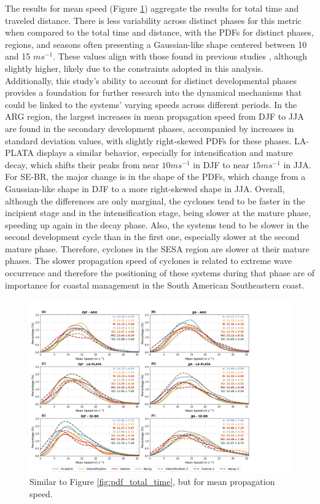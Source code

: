 The results for mean speed (Figure \ref{fig:pdf_mean_speed}) aggregate the results for total time and traveled distance. There is less variability across distinct phases for this metric when compared to the total time and distance, with the PDFs for distinct phases, regions, and seasons often presenting a Gaussian-like shape centered between 10 and 15 \(m s^{-1}\). These values align with those found in previous studies \citep{gramcianinov2019properties, gramcianinov2020analysis, hoskins2005new}, although slightly higher, likely due to the constraints adopted in this analysis. Additionally, this study's ability to account for distinct developmental phases provides a foundation for further research into the dynamical mechanisms that could be linked to the systems' varying speeds across different periods. In the ARG region, the largest increases in mean propagation speed from DJF to JJA are found in the secondary development phases, accompanied by increases in standard deviation values, with slightly right-skewed PDFs for these phases. LA-PLATA displays a similar behavior, especially for intensification and mature decay, which shifts their peaks from near \(10 m s^{-1}\) in DJF to near \(15 m s^{-1}\) in JJA. For SE-BR, the major change is in the shape of the PDFs, which change from a Gaussian-like shape in DJF to a more right-skewed shape in JJA. Overall, although the differences are only marginal, the cyclones tend to be faster in the incipient stage and in the intensification stage, being slower at the mature phase, speeding up again in the decay phase. Also, the systems tend to be slower in the second development cycle than in the first one, especially slower at the second mature phase. Therefore, cyclones in the SESA region are slower at their mature phases. The slower propagation speed of cyclones is related to extreme wave occurrence \citep{gramcianinov2023impact} and therefore the positioning of these systems during that phase are of importance for coastal management in the South American Southeastern coast.

\begin{figure}[h!]
\centering
\includegraphics[width=\textwidth]{figs_4/pdf_mean_speed.png}
\caption[PDF - Mean Speed]{Similar to Figure \ref{fig:pdf_total_time}, but for mean propagation speed.}
\label{fig:pdf_mean_speed}
\end{figure}

